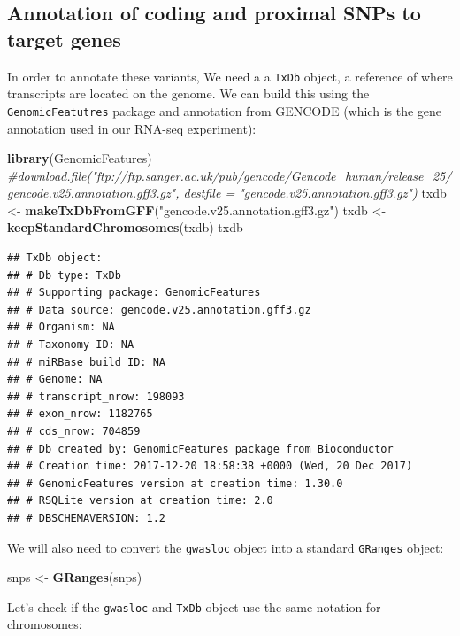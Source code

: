 \documentclass[9pt,a4paper,]{extarticle}
\newenvironment{Shaded}{\begin{snugshade}}{\end{snugshade}}
\newcommand{\KeywordTok}[1]{\textcolor[rgb]{0.13,0.29,0.53}{\textbf{#1}}}
\newcommand{\StringTok}[1]{\textcolor[rgb]{0.31,0.60,0.02}{#1}}
\newcommand{\CommentTok}[1]{\textcolor[rgb]{0.56,0.35,0.01}{\textit{#1}}}
\newcommand{\NormalTok}[1]{#1}
\begin{document}
\subsection{Annotation of coding and proximal SNPs to target genes}\label{annotation-of-coding-and-proximal-snps-to-target-genes}

In order to annotate these variants, We need a a \texttt{TxDb} object, a reference of where transcripts are located on the genome.
We can build this using the \texttt{GenomicFeatutres} \citep{Lawrence2013} package and annotation from GENCODE (which is the gene annotation used in our RNA-seq experiment):

\begin{Shaded}
\begin{Highlighting}[]
\KeywordTok{library}\NormalTok{(GenomicFeatures)}
\CommentTok{#download.file("ftp://ftp.sanger.ac.uk/pub/gencode/Gencode_human/release_25/gencode.v25.annotation.gff3.gz", destfile = "gencode.v25.annotation.gff3.gz")}
\NormalTok{txdb <-}\StringTok{ }\KeywordTok{makeTxDbFromGFF}\NormalTok{(}\StringTok{"gencode.v25.annotation.gff3.gz"}\NormalTok{)}
\NormalTok{txdb <-}\StringTok{ }\KeywordTok{keepStandardChromosomes}\NormalTok{(txdb)}
\NormalTok{txdb}
\end{Highlighting}
\end{Shaded}

\begin{verbatim}
## TxDb object:
## # Db type: TxDb
## # Supporting package: GenomicFeatures
## # Data source: gencode.v25.annotation.gff3.gz
## # Organism: NA
## # Taxonomy ID: NA
## # miRBase build ID: NA
## # Genome: NA
## # transcript_nrow: 198093
## # exon_nrow: 1182765
## # cds_nrow: 704859
## # Db created by: GenomicFeatures package from Bioconductor
## # Creation time: 2017-12-20 18:58:38 +0000 (Wed, 20 Dec 2017)
## # GenomicFeatures version at creation time: 1.30.0
## # RSQLite version at creation time: 2.0
## # DBSCHEMAVERSION: 1.2
\end{verbatim}

We will also need to convert the \texttt{gwasloc} object into a standard \texttt{GRanges} object:

\begin{Shaded}
\begin{Highlighting}[]
\NormalTok{snps <-}\StringTok{ }\KeywordTok{GRanges}\NormalTok{(snps)}
\end{Highlighting}
\end{Shaded}

Let's check if the \texttt{gwasloc} and \texttt{TxDb} object use the same notation for chromosomes:
\end{document}
